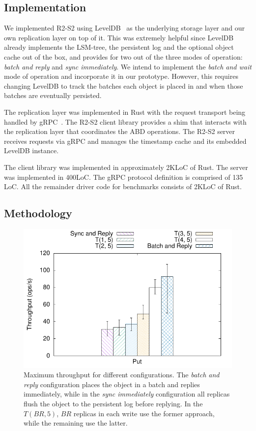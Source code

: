 \subsection{Implementation}\label{sec:r2s2implementation}

We implemented \ac{R2-S2} using LevelDB~\cite{leveldb} as the
underlying storage layer and our own replication layer on top of
it. This was extremely helpful since LevelDB already implements
the \ac{LSM-tree}, the persistent log and the optional object cache
out of the box, and provides for two out of the three modes of
operation: \emph{batch and reply} and \emph{sync immediately}.
We intend to implement the \emph{batch and wait} mode of
operation and incorporate it in our prototype. However, this
requires changing LevelDB to track the batches each object is
placed in and when those batches are eventually persisted.

The replication layer was implemented in Rust with the request transport
being handled by gRPC~\cite{grpc}. The \ac{R2-S2} client library
provides a shim that interacts with the replication layer that
coordinates the \ac{ABD} operations. The \ac{R2-S2} server
receives requests via gRPC and manages the timestamp cache and
its embedded LevelDB instance.

The client library was implemented in approximately 2KLoC of
Rust. The server was implemented in 400LoC. The gRPC protocol
definition is comprised of 135 LoC. All the remainder driver code
for benchmarks consists of 2KLoC of Rust.

\subsection{Methodology}\label{ssec:r2s2methodology}

\begin{figure}[t]
    \centering
    \includegraphics[width=.75\linewidth]{r2s2_results/abd_small/tput.pdf}
    \caption{Maximum throughput for different configurations.
    The \emph{batch and reply} configuration places the
    object in a batch and replies immediately, while in the
    \emph{sync immediately} configuration all replicas
    flush the object to the persistent log before replying. In
    the $T(BR, 5)$, $BR$ replicas in each write use the former
    approach, while the remaining use the
    latter.}\label{fig:r2s2_asym}
\end{figure}
